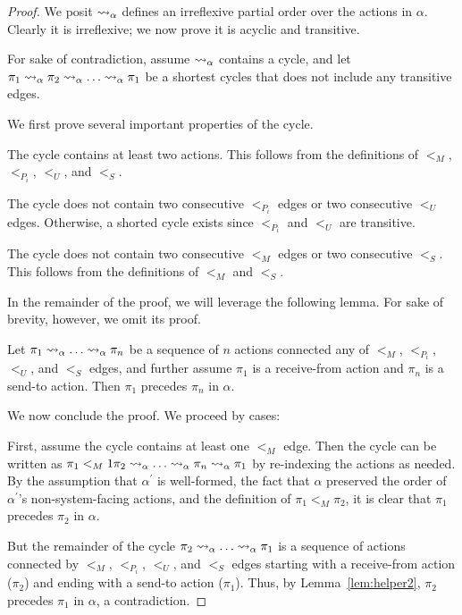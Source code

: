 \begin{proof}
We posit $\rightsquigarrow_{\alpha}$ defines an irreflexive partial order over the actions
in $\alpha$. Clearly it is irreflexive; we now prove it is acyclic and transitive.

For sake of contradiction, assume $\rightsquigarrow_{\alpha}$ contains a cycle, and
let $\pi_1 \rightsquigarrow_{\alpha} \pi_2 \rightsquigarrow_{\alpha} \ldots \rightsquigarrow_{\alpha} \pi_1$
be a shortest cycles that does not include any transitive edges.

We first prove several important properties of the cycle.

 The cycle contains at least two actions.
This follows from the definitions of $<_M$, $<_{P_i}$, $<_U$, and $<_S$.

 The cycle does not contain two consecutive
$<_{P_i}$ edges or two consecutive $<_U$ edges. Otherwise, a shorted cycle
exists since $<_{P_i}$ and $<_U$ are transitive.

 The cycle does not contain two consecutive
$<_M$ edges or two consecutive $<_S$. This follows from the definitions of
$<_M$ and $<_S$.

In the remainder of the proof, we will leverage the following lemma. For
sake of brevity, however, we omit its proof.

\begin{lem}
    Let $\pi_1 \rightsquigarrow_{\alpha} \ldots \rightsquigarrow_{\alpha} \pi_n$
    be a sequence of $n$ actions connected any of $<_M$, $<_{P_i}$, $<_U$,
    and $<_S$ edges, and further assume $\pi_1$ is a receive-from action
    and $\pi_n$ is a send-to action. Then $\pi_1$ precedes $\pi_n$ in $\alpha$.
    \label{lem:helper2}
\end{lem}

We now conclude the proof. We proceed by cases:

First, assume the cycle contains at least one $<_M$ edge. Then the cycle can be written as
$\pi_1 <_M1 \pi_2 \rightsquigarrow_{\alpha} \ldots \rightsquigarrow_{\alpha} \pi_n \rightsquigarrow_{\alpha} \pi_1$ 
by re-indexing the actions as needed. By the assumption that $\alpha^\prime$ is well-formed,
the fact that $\alpha$ preserved the order of $\alpha^\prime$'s non-system-facing actions,
and the definition of $\pi_1 <_M \pi_2$, it is clear that $\pi_1$ precedes $\pi_2$ in $\alpha$.

But the remainder of the cycle
$\pi_2 \rightsquigarrow_{\alpha} \ldots \rightsquigarrow_{\alpha} \pi_1$
is a sequence of actions connected by $<_M$, $<_{P_i}$, $<_U$, and $<_S$ edges
starting with a receive-from action ($\pi_2$) and ending with a send-to action
($\pi_1$). Thus, by Lemma~\ref{lem:helper2}, $\pi_2$ precedes $\pi_1$ in $\alpha$,
a contradiction.


\end{proof}
